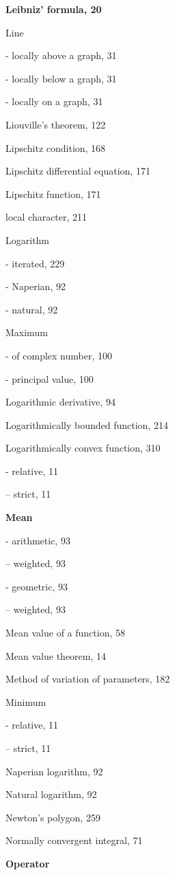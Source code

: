 \par\noindent\textbf{Leibniz' formula, 20}\par

Line

- locally above a graph, 31

- locally below a graph, 31

- locally on a graph, 31

Liouville's theorem, 122

Lipschitz condition, 168

Lipschitz differential equation, 171

Lipschitz function, 171

local character, 211

Logarithm

- iterated, 229

- Naperian, 92

- natural, 92

Maximum

- of complex number, 100

- principal value, 100

Logarithmic derivative, 94

Logarithmically bounded function, 214

Logarithmically convex function, 310

- relative, 11

-- strict, 11

\par\noindent\textbf{Mean}\par

- arithmetic, 93

-- weighted, 93

- geometric, 93

-- weighted, 93

Mean value of a function, 58

Mean value theorem, 14

Method of variation of parameters, 182

Minimum

- relative, 11

-- strict, 11

Naperian logarithm, 92

Natural logarithm, 92

Newton's polygon, 259

Normally convergent integral, 71

\par\noindent\textbf{Operator}\par

